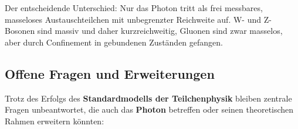 Der entscheidende Unterschied:  
Nur das Photon tritt als frei messbares, masseloses Austauschteilchen mit unbegrenzter Reichweite auf.  
W- und Z-Bosonen sind massiv und daher kurzreichweitig, Gluonen sind zwar masselos, aber durch Confinement in gebundenen Zuständen gefangen.
\vspace{1em}
\begin{tcolorbox}[hinweisbox, title=Vergleich der Eichbosonen]
	\label{box:eichbosonen_vergleich}
	\small
	
	
\end{tcolorbox}




\subsection{Offene Fragen und Erweiterungen}

Trotz des Erfolgs des \textbf{Standardmodells der Teilchenphysik} bleiben zentrale Fragen unbeantwortet, die auch das \textbf{Photon} betreffen oder seinen theoretischen Rahmen erweitern könnten:

